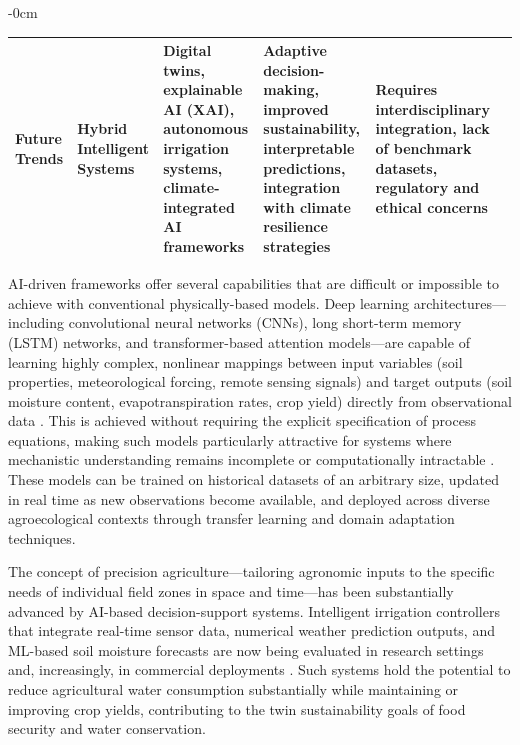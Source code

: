\documentclass[land,review,accept,pdftex,oneauthor]{Definitions/mdpi}
\begin{document}
\begin{table}[H]
\begin{adjustwidth}{-\extralength}{0cm}
\begin{minipage}{\fulllength}
\begin{tabularx}{\textwidth}{m{2.2cm}<{\raggedright}m{2.6cm}<{\raggedright}m{3.3cm}<{\raggedright}m{3.4cm}<{\raggedright}m{3.3cm}<{\raggedright}m{1.2cm}<{\raggedright}}
Future Trends &
Hybrid Intelligent Systems &
Digital twins, explainable AI (XAI), autonomous irrigation systems, climate-integrated AI frameworks &
Adaptive decision-making, improved sustainability, interpretable predictions, integration with climate resilience strategies &
Requires interdisciplinary integration, lack of benchmark datasets, regulatory and ethical concerns &
\citep{Pylianidis2021,Verdouw2021,arrieta2020explainable,Sit2020} \\

\bottomrule
\end{tabularx}
\end{minipage}
\end{adjustwidth}
\end{table}
AI-driven frameworks offer several capabilities that are difficult or impossible to achieve with conventional physically-based models. Deep learning architectures---including convolutional neural networks (CNNs), long short-term memory (LSTM) networks, and transformer-based attention models---are capable of learning highly complex, nonlinear mappings between input variables (soil properties, meteorological forcing, remote sensing signals) and target outputs (soil moisture content, evapotranspiration rates, crop yield) directly from observational data \citep{Tripathy}. This is achieved without requiring the explicit specification of process equations, making such models particularly attractive for systems where mechanistic understanding remains incomplete or computationally intractable \citep{lecun2015deep}. These models can be trained on historical datasets of an arbitrary size, updated in real time as new observations become available, and deployed across diverse agroecological contexts through transfer learning and domain adaptation techniques.

The concept of precision agriculture---tailoring agronomic inputs to the specific needs of individual field zones in space and time---has been substantially advanced by AI-based decision-support systems. Intelligent irrigation controllers that integrate real-time sensor data, numerical weather prediction outputs, and ML-based soil moisture forecasts are now being evaluated in research settings and, increasingly, in commercial deployments \citep{vij2020iot}. Such systems hold the potential to reduce agricultural water consumption substantially while maintaining or improving crop yields, contributing to the twin sustainability goals of food security and water conservation.
\end{document}
